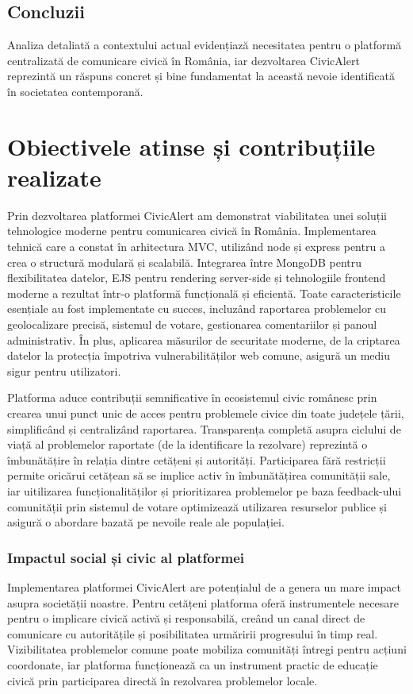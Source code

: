 \documentclass[12pt,a4paper]{report}
\begin{document}
\section{Concluzii}
Analiza detaliată a contextului actual evidențiază necesitatea pentru o platformă centralizată de comunicare civică în România, iar dezvoltarea CivicAlert reprezintă un răspuns concret și bine fundamentat la această nevoie  identificată în societatea contemporană.
\chapter{Obiectivele atinse și contribuțiile realizate}

Prin dezvoltarea platformei CivicAlert am demonstrat viabilitatea unei soluții tehnologice moderne pentru comunicarea civică în România. Implementarea tehnică care a constat în arhitectura MVC, utilizând node și express pentru a crea o structură modulară și scalabilă. Integrarea  între MongoDB pentru flexibilitatea datelor, EJS pentru rendering server-side și tehnologiile frontend moderne a rezultat într-o platformă funcțională și eficientă. Toate caracteristicile esențiale au fost implementate cu succes, incluzând raportarea problemelor cu geolocalizare precisă, sistemul de votare, gestionarea comentariilor  și panoul administrativ. În plus, aplicarea măsurilor de securitate moderne, de la criptarea datelor la protecția împotriva vulnerabilităților web comune, asigură un mediu sigur pentru utilizatori.

Platforma aduce contribuții semnificative în ecosistemul civic românesc prin crearea unui punct unic de acces pentru problemele civice din toate județele țării, simplificând și centralizând raportarea. Transparența completă asupra ciclului de viață al problemelor raportate (de la identificare la rezolvare) reprezintă o îmbunătățire în relația dintre cetățeni și autorități. Participarea  fără restricții  permite oricărui cetățean să se implice activ în îmbunătățirea comunității sale, iar uitilizarea funcționalităților și prioritizarea  problemelor pe baza feedback-ului comunității prin sistemul de votare optimizează utilizarea resurselor publice și asigură o abordare bazată pe nevoile reale ale populației.

\subsection{Impactul social și civic al platformei}

Implementarea platformei CivicAlert are potențialul de a genera un mare impact asupra societății noastre. Pentru cetățeni  platforma oferă instrumentele necesare pentru o implicare civică activă și responsabilă, creând un canal direct de comunicare cu autoritățile și posibilitatea urmăririi progresului în timp real. Vizibilitatea problemelor comune poate mobiliza comunități întregi pentru acțiuni coordonate, iar platforma funcționează ca un instrument practic de educație civică prin participarea directă în rezolvarea problemelor locale.
\end{document}
